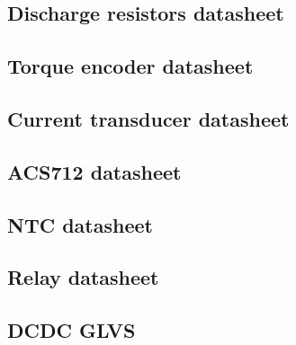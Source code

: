 
\subsection{Discharge resistors datasheet}\label{app:discharge_resistor_sheet}
	

\subsection{Torque encoder datasheet}\label{app:torque_encoder_datasheet}
	

\subsection{Current transducer datasheet}\label{app:bspd_lem_datasheet}
	

\subsection{ACS712 datasheet}\label{app:acs712_datasheet}
	

\subsection{NTC datasheet}\label{app:ntc_datasheet}
	

\subsection{Relay datasheet}\label{app:precharge_relay_datasheet}
	
	
\subsection{DCDC GLVS}\label{app:glvs_dcdc}
	

